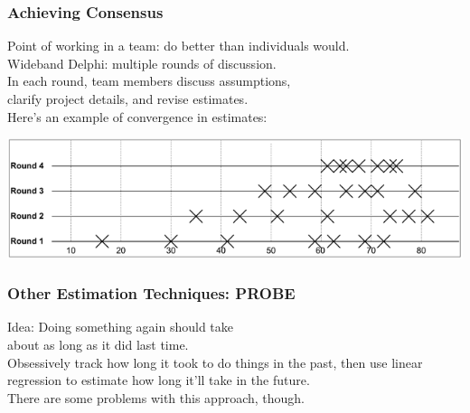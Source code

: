\begin{frame}
\frametitle{Achieving Consensus}

\begin{changemargin}{1cm}

Point of working in a team: do better than individuals would.\\[1em]

Wideband Delphi: multiple rounds of discussion.\\[1em]

In each round, team members discuss assumptions,\\ clarify
project details, and revise estimates. \\[1em]

Here's an example of convergence
in estimates:
\end{changemargin}
\includegraphics[width=\textwidth]{images/converging-effort-estimates.png}

\end{frame}

\begin{frame}
\frametitle{Other Estimation Techniques: PROBE}

\begin{changemargin}{.75cm}

Idea: Doing something again should take\\ about as long as it did last time.\\[1em]

Obsessively track how long it took to do things in the past, then
use linear regression to estimate how long it'll take in the future.\\[1em]

There are some problems with this approach, though.
\end{changemargin}
\end{frame}

